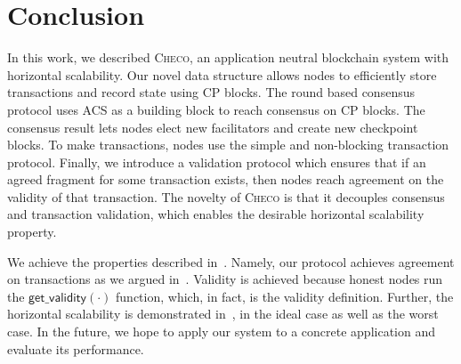 \section{Conclusion}
\label{sec:conclusion}

In this work, we described \textsc{Checo}, an application neutral blockchain system with horizontal scalability.
Our novel data structure allows nodes to efficiently store transactions and record state using CP blocks.
The round based consensus protocol uses ACS as a building block to reach consensus on CP blocks.
The consensus result lets nodes elect new facilitators and create new checkpoint blocks.
To make transactions, nodes use the simple and non-blocking transaction protocol.
Finally, we introduce a validation protocol which ensures that if an agreed fragment for some transaction exists,
then nodes reach agreement on the validity of that transaction.
The novelty of \textsc{Checo} is that it decouples consensus and transaction validation,
which enables the desirable horizontal scalability property.

We achieve the properties described in~.
Namely, our protocol achieves agreement on transactions as we argued in~.
Validity is achieved because honest nodes run the $\textsf{get\_validity}(\cdot)$ function, which, in fact, is the validity definition.
Further, the horizontal scalability is demonstrated in~,
in the ideal case as well as the worst case.
In the future, we hope to apply our system to a concrete application and evaluate its performance.

